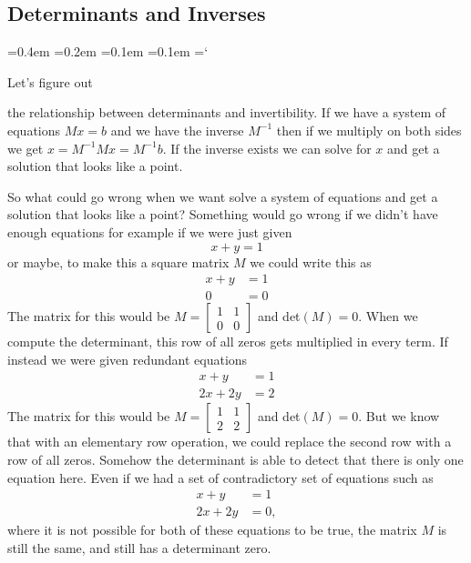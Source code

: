 
\subsection*{Determinants and Inverses}

{\ttfamily
{}\font=0.4em
\font=0.2em
\font=0.1em
\font=0.1em
\hyphenchar\font=`\-


\hypertarget{scripts_elementary_matrices_determinants_ii_inverses}{Let's figure out} the relationship between determinants and invertibility. If we have a system of equations $Mx=b$ and we have the inverse $M^{-1}$ then if we multiply on both sides we get $ x = M^{-1}Mx= M^{-1}b$. If the inverse exists we can solve for $x$ and get a solution that looks like a point. 

So what could go wrong when we want solve a system of equations and get a solution that looks like a point? Something would go wrong if we didn't have enough equations for example if we were just given 
\[
x+y = 1
\]
or maybe, to make this a square matrix $M$ we could write this as 
\begin{align*}
x+y &= 1\\
0 &= 0
\end{align*}
The matrix for this would be 
$M =\begin{bmatrix}
1 & 1\\
0& 0 
\end{bmatrix}$ 
and det$(M) = 0$. When we compute the determinant, this row of all zeros gets multiplied in every term. If instead we were given redundant equations 
\begin{align*}
x+y &= 1\\
2x+2y &= 2
\end{align*}
The matrix for this would be 
$M =\begin{bmatrix}
1 & 1\\
2& 2 
\end{bmatrix}$  and det$(M) = 0$. But we know that with an elementary row operation, we could replace the second row with a row of all zeros. Somehow the determinant is able to detect that there is only one equation here. Even if we had a set of contradictory set of equations such as
\begin{align*}
x+y &= 1\\
2x+2y &= 0,
\end{align*}
where it is not possible for both of these equations to be true, the matrix $M$ is still the same, and still has a determinant zero.

}
